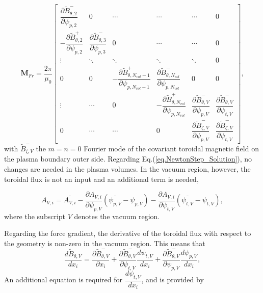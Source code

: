 \begin{equation}
	\mathbf{M}_{Fr} = \frac{2\pi}{\mu_0} \begin{bmatrix}
		\dfrac{\partial \tilde{B}^-_{\theta,2}}{\partial{\psi_{p,2}}} & 0 & \cdots  & \cdots & \cdots & 0\\
		-\dfrac{\partial \tilde{B}^+_{\theta,2}}{\partial{\psi_{p,2}}} & \dfrac{\partial \tilde{B}^-_{\theta,3}}{\partial{\psi_{p,3}}} & 0  & \cdots & \cdots & 0\\
		\vdots  & \ddots  & \ddots & \ddots & \ddots & 0\\
		0 & 0 & -\dfrac{\partial \tilde{B}^+_{\theta,N_{vol}-1}}{\partial{\psi_{p,N_{vol}-1}}} & \dfrac{\partial \tilde{B}^-_{\theta,N_{vol}}}{\partial{\psi_{p,N_{vol}}}} & 0 & 0 \\
		\vdots & \cdots & 0 & -\dfrac{\partial \tilde{B}^+_{\theta,N_{vol}}}{\partial{\psi_{p,N_{vol}}}} & \dfrac{\partial \tilde{B}^-_{\theta,V}}{\partial{\psi_{p,V}}} & \dfrac{\partial \tilde{B}^-_{\theta,V}}{\partial{\psi_{t,V}}} \\
		0 & \cdots & \cdots & 0 & \dfrac{\partial \tilde{B}_{\zeta,V}^-}{\partial \psi_{p,V}} & \dfrac{\partial \tilde{B}_{\zeta,V}^-}{\partial \psi_{t,V}}
	\end{bmatrix},
\end{equation}
with $\tilde{B}^-_{\zeta,V}$ the $m=n=0$ Fourier mode of the covariant toroidal magnetic field on the plasma boundary outer side. Regarding Eq.(\ref{eq.NewtonStep_Solution}), no changes are needed in the plasma volumes. In the vacuum region, however, the toroidal flux is not an input and an additional term is needed,

\begin{equation}
	A_{V,i} = \overbar{A_{V,i}} - \frac{\partial {A_{V,i}}}{\partial {\psi_{p,V}}} (\overbar{\psi_{p,V}} - \psi_{p,V}) - \frac{\partial {A_{V,i}}}{\partial {\psi_{t,V}}} (\overbar{\psi_{t,V}} - \psi_{t,V}),
\end{equation}
where the subscript $V$ denotes the vacuum region.

Regarding the force gradient, the derivative of the toroidal flux with respect to the geometry is non-zero in the vacuum region. This means that
\begin{equation}
	\frac{d\tilde{B}_{\theta,V}}{dx_i} = \frac{\partial \tilde{B}^-_{\theta,V}}{\partial x_i} + \frac{\partial \tilde{B}^-_{\theta,V}}{\partial \psi_{t,V}}\frac{d \psi_{t,V}}{d x_i} + \frac{\partial \tilde{B}^-_{\theta,V}}{\partial \psi_{p,V}}\frac{d \psi_{p,V}}{d x_i},
\end{equation}
An additional equation is required for $\dfrac{d\psi_{t,V}}{dx_i}$, and is provided by

